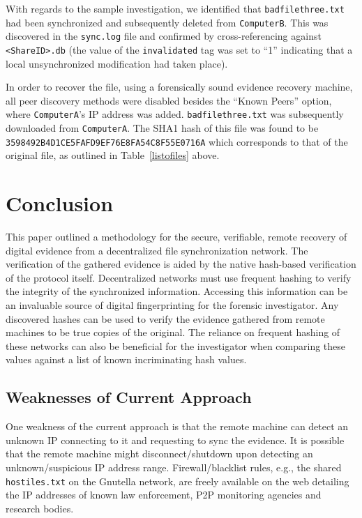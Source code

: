 \documentclass{jdfsl}
\begin{document}
With regards to the sample investigation, we identified that \texttt{badfilethree.txt} had been synchronized and subsequently deleted from \texttt{ComputerB}. This was discovered in the \texttt{sync.log} file and confirmed by cross-referencing against \texttt{<ShareID>.db} 
(the value of the \texttt{invalidated} tag was set to ``1'' indicating that a local unsynchronized modification had taken place). 

In order to recover the file, using a forensically sound evidence recovery machine, all peer discovery methods were disabled besides the ``Known Peers'' option, where \texttt{ComputerA}'s IP address was added. \texttt{badfilethree.txt} was subsequently downloaded from \texttt{ComputerA}. The SHA1 hash of this file was found to be \texttt{3598492B4D1CE5FAFD9EF76E8FA54C8F55E0716A} which corresponds to that of the original file, as outlined in Table~\ref{listofiles} above.\\




\section{Conclusion}
\label{conclusion}
This paper outlined a methodology for the secure, verifiable, remote recovery of digital evidence from a decentralized file synchronization network. The verification of the gathered evidence is aided by the native hash-based verification of the protocol itself. Decentralized networks must use frequent hashing to verify the integrity of the synchronized information. Accessing this information can be an invaluable source of digital fingerprinting for the forensic investigator. Any discovered hashes can be used to verify the evidence gathered from remote machines to be true copies of the original. The reliance on frequent hashing of these networks can also be beneficial for the investigator when comparing these values against a list of known incriminating hash values.\\

\subsection{Weaknesses of Current Approach}
\label{weaknesses}
One weakness of the current approach is that the remote machine can detect an unknown IP connecting to it and requesting to sync the evidence. It is possible that the remote machine might disconnect/shutdown upon detecting an unknown/suspicious IP address range. Firewall/blacklist rules, e.g., the shared \texttt{hostiles.txt} on the Gnutella network, are freely available on the web detailing the IP addresses of known law enforcement, P2P monitoring agencies and research bodies.
\end{document}
